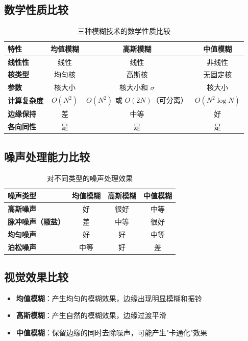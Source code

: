 \documentclass{article}
\begin{document}
\subsection{数学性质比较}

\begin{table}[h]
\centering
\caption{三种模糊技术的数学性质比较}
\begin{tabular}{|l|c|c|c|}
\hline
\textbf{特性} & \textbf{均值模糊} & \textbf{高斯模糊} & \textbf{中值模糊} \\
\hline
\textbf{线性性} & 线性 & 线性 & 非线性 \\
\hline
\textbf{核类型} & 均匀核 & 高斯核 & 无固定核 \\
\hline
\textbf{参数} & 核大小 & 核大小和 $\sigma$ & 核大小 \\
\hline
\textbf{计算复杂度} & $O(N^2)$ & $O(N^2)$ 或 $O(2N)$（可分离） & $O(N^2 \log N)$ \\
\hline
\textbf{边缘保持} & 差 & 中等 & 好 \\
\hline
\textbf{各向同性} & 是 & 是 & 是 \\
\hline
\end{tabular}
\end{table}

\subsection{噪声处理能力比较}

\begin{table}[h]
\centering
\caption{对不同类型的噪声处理效果}
\begin{tabular}{|l|c|c|c|}
\hline
\textbf{噪声类型} & \textbf{均值模糊} & \textbf{高斯模糊} & \textbf{中值模糊} \\
\hline
\textbf{高斯噪声} & 好 & 很好 & 中等 \\
\hline
\textbf{脉冲噪声（椒盐）} & 差 & 中等 & 很好 \\
\hline
\textbf{均匀噪声} & 好 & 好 & 中等 \\
\hline
\textbf{泊松噪声} & 中等 & 好 & 差 \\
\hline
\end{tabular}
\end{table}

\subsection{视觉效果比较}

\begin{itemize}
    \item \textbf{均值模糊}：产生均匀的模糊效果，边缘出现明显模糊和振铃
    \item \textbf{高斯模糊}：产生自然的模糊效果，边缘过渡平滑
    \item \textbf{中值模糊}：保留边缘的同时去除噪声，可能产生"卡通化"效果
\end{itemize}
\end{document}
